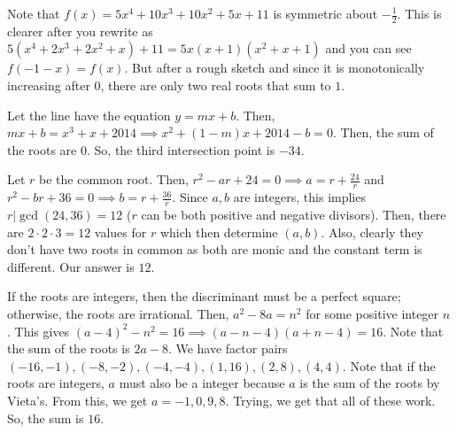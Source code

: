 \documentclass[11pt]{article}
\begin{document}

\begin{sol} 
Note that $f(x)=5x^4+10x^3+10x^2+5x+11$ is symmetric about $-\frac{1}{2}$. This is clearer after you rewrite as $5(x^4+2x^3+2x^2+x)+11=5x(x+1)(x^2+x+1)$ and you can see $f(-1-x)=f(x)$. But after a rough sketch and since it is monotonically increasing after $0$, there are only two real roots that sum to $\boxed{1}$.
\end{sol}


\begin{sol}
Let the line have the equation $y=mx+b$. Then, $mx+b=x^3+x+2014\implies x^2+(1-m)x+2014-b=0$. Then, the sum of the roots are $0$. So, the third intersection point is $\boxed{-34}$.
\end{sol}


\begin{sol}
Let $r$ be the common root. Then, $r^2-ar+24=0\implies a = r + \frac{24}{r}$ and $r^2-br+36=0\implies b = r + \frac{36}{r}$. Since $a,b$ are integers, this implies $r|\gcd(24,36)=12$ ($r$ can be both positive and negative divisors). Then, there are $2\cdot 2\cdot 3 =12$ values for $r$ which then determine $(a,b)$. Also, clearly they don't have two roots in common as both are monic and the constant term is different. Our answer is $\boxed{12}$.
\end{sol}


\begin{sol}
If the roots are integers, then the discriminant must be a perfect square; otherwise, the roots are irrational. Then, $a^2-8a=n^2$ for some positive integer $n$. This gives $(a-4)^2-n^2=16\implies (a-n-4)(a+n-4)=16$. Note that the sum of the roots is $2a-8$. We have factor pairs $(-16,-1),(-8,-2),(-4,-4),(1,16),(2,8),(4,4)$. Note that if the roots are integers, $a$ must also be a integer because $a$ is the sum of the roots by Vieta's. From this, we get $a=-1, 0, 9, 8$. Trying, we get that all of these work. So, the sum is $\boxed{16}$.
\end{sol}
\end{document}
